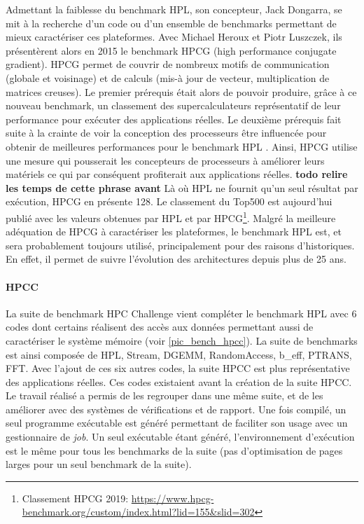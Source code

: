             Admettant la faiblesse du benchmark HPL, son concepteur, Jack Dongarra, se mit à la recherche d'un code ou d'un ensemble de benchmarks permettant de mieux caractériser ces plateformes. Avec Michael Heroux et Piotr Luszczek, ils présentèrent alors en 2015 le benchmark HPCG (high performance conjugate gradient). HPCG permet de couvrir de nombreux motifs de communication (globale et voisinage) et de calculs  (mis-à jour de vecteur, multiplication de matrices creuses). 
            Le premier prérequis était alors de pouvoir produire, grâce à ce nouveau benchmark, un classement des supercalculateurs représentatif de leur performance pour exécuter des applications réelles. Le deuxième prérequis fait suite à la crainte de voir la conception des processeurs être influencée pour obtenir de meilleures performances pour le benchmark HPL \cite{Dongarra2013}. Ainsi, HPCG utilise une mesure qui pousserait les concepteurs de processeurs à améliorer leurs matériels ce qui par conséquent profiterait aux applications réelles. \textbf{todo relire les temps de cette phrase avant} Là où HPL ne fournit qu'un seul résultat par exécution, HPCG en présente 128. Le classement du Top500 est aujourd'hui publié avec les valeurs obtenues par HPL et par HPCG\footnote{Classement HPCG 2019: \url{https://www.hpcg-benchmark.org/custom/index.html?lid=155&slid=302}}. Malgré la meilleure adéquation de HPCG à caractériser les plateformes, le benchmark HPL est, et sera probablement toujours utilisé, principalement pour des raisons d'historiques. En effet, il permet de suivre l'évolution des architectures depuis plus de 25 ans. 
            
        \paragraph{HPCC \cite{Luszczek2006}} 
            
            La suite de benchmark HPC Challenge vient compléter le benchmark HPL avec 6 codes dont certains réalisent des accès aux données permettant aussi de caractériser le système mémoire (voir \autoref{pic_bench_hpcc}). La suite de benchmarks est ainsi composée de HPL, Stream, DGEMM, RandomAccess, b\_eff, PTRANS, FFT. Avec l'ajout de ces six autres codes, la suite HPCC est plus représentative des applications réelles. Ces codes existaient avant la création de la suite HPCC. Le travail réalisé a permis de les regrouper dans une même suite, et de les améliorer avec des systèmes de vérifications et de rapport. Une fois compilé, un seul programme exécutable est généré permettant de faciliter son usage avec un gestionnaire de \textit{job}. Un seul exécutable étant généré, l'environnement d'exécution est le même pour tous les benchmarks de la suite (pas d'optimisation de pages larges pour un seul benchmark de la suite). 
            
